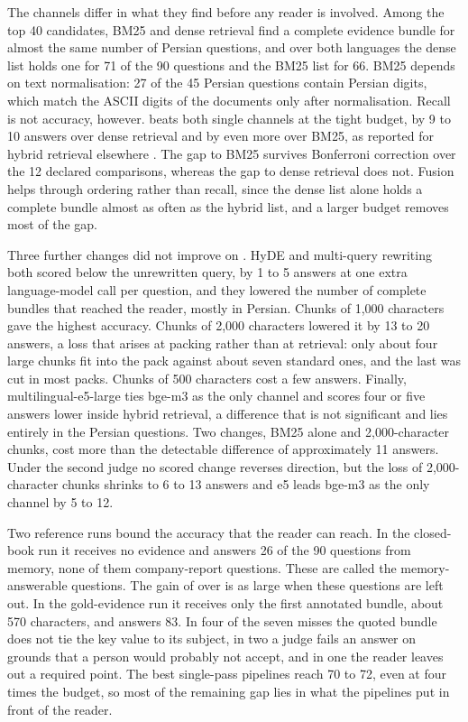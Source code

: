The channels differ in what they find before any reader is involved. Among the top 40 candidates, BM25 and dense retrieval find a complete evidence bundle for almost the same number of Persian questions, and over both languages the dense list holds one for 71 of the 90 questions and the BM25 list for 66. BM25 depends on text normalisation: 27 of the 45 Persian questions contain Persian digits, which match the ASCII digits of the documents only after normalisation. Recall is not accuracy, however. \hybrid{} beats both single channels at the tight budget, by 9 to 10 answers over dense retrieval and by even more over BM25, as reported for hybrid retrieval elsewhere \citep{bruch2023fusion}. The gap to BM25 survives Bonferroni correction over the 12 declared comparisons, whereas the gap to dense retrieval does not. Fusion helps through ordering rather than recall, since the dense list alone holds a complete bundle almost as often as the hybrid list, and a larger budget removes most of the gap.

Three further changes did not improve on \hybrid{}. HyDE \citep{gao2023hyde} and multi-query rewriting both scored below the unrewritten query, by 1 to 5 answers at one extra language-model call per question, and they lowered the number of complete bundles that reached the reader, mostly in Persian. Chunks of 1,000 characters gave the highest accuracy. Chunks of 2,000 characters lowered it by 13 to 20 answers, a loss that arises at packing rather than at retrieval: only about four large chunks fit into the pack against about seven standard ones, and the last was cut in most packs. Chunks of 500 characters cost a few answers. Finally, multilingual-e5-large ties bge-m3 as the only channel and scores four or five answers lower inside hybrid retrieval, a difference that is not significant and lies entirely in the Persian questions. Two changes, BM25 alone and 2,000-character chunks, cost more than the detectable difference of approximately 11 answers. Under the second judge no scored change reverses direction, but the loss of 2,000-character chunks shrinks to 6 to 13 answers and e5 leads bge-m3 as the only channel by 5 to 12. %

Two reference runs bound the accuracy that the reader can reach. In the closed-book run it receives no evidence and answers 26 of the 90 questions from memory, none of them company-report questions. These are called the memory-answerable questions. The gain of \lexb{} over \hybrid{} is as large when these questions are left out. In the gold-evidence run it receives only the first annotated bundle, about 570 characters, and answers 83. In four of the seven misses the quoted bundle does not tie the key value to its subject, in two a judge fails an answer on grounds that a person would probably not accept, and in one the reader leaves out a required point. The best single-pass pipelines reach 70 to 72, even at four times the budget, so most of the remaining gap lies in what the pipelines put in front of the reader.

